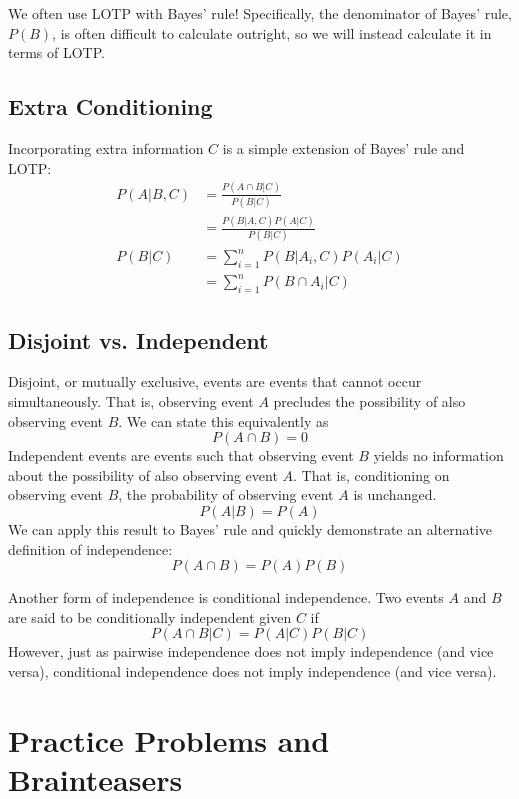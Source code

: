 \documentclass[11pt]{article}
\begin{document}
\begin{notes}
We often use LOTP with Bayes' rule! Specifically, the denominator of Bayes' rule, $P(B)$, is often difficult to calculate outright, so we will instead calculate it in terms of LOTP. 

\subsection*{Extra Conditioning}
Incorporating extra information $C$ is a simple extension of Bayes' rule and LOTP:
\begin{align}
    P(A|B, C) &= \frac{P(A \cap B | C)}{P(B|C)} \\
    &= \frac{P(B|A,C)P(A|C)}{P(B|C)}\\
    P(B|C) &= \sum_{i=1}^n P(B | A_i, C) P (A_i |C)\\
    &= \sum_{i=1}^n P(B \cap A_i |C)
\end{align}

\subsection*{Disjoint vs. Independent}
Disjoint, or mutually exclusive, events are events that cannot occur simultaneously. That is, observing event $A$ precludes the possibility of also observing event $B$. We can state this equivalently as 
    \[P(A \cap B) = 0\]
Independent events are events such that observing event $B$ yields no information about the possibility of also observing event $A$. That is, conditioning on observing event $B$, the probability of observing  event $A$ is unchanged.
    \[P(A|B) = P(A)\]
We can apply this result to Bayes' rule and quickly demonstrate an alternative definition of independence:
    \[P(A \cap B) = P(A)P(B)\]

Another form of independence is conditional independence. Two events $A$ and $B$ are said to be conditionally independent given $C$ if 
    \[P(A \cap B | C) = P(A|C) P(B|C)\]
However, just as pairwise independence does not imply independence (and vice versa), conditional independence does not imply independence (and vice versa).
\end{notes}
\newpage
       

\section*{Practice Problems and Brainteasers}
\end{document}
